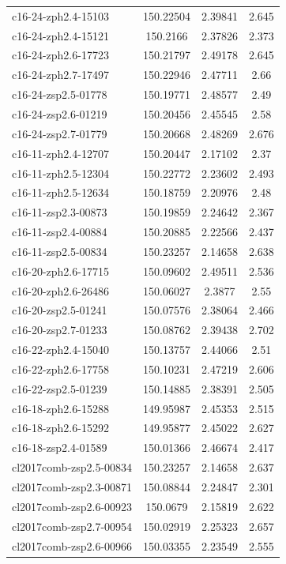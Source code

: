 \documentclass[twocolumn,tight,times]{aastex63}
\begin{document}
\begin{center}
\begin{longtable}{l|c|c|c}
c16-24-zph2.4-15103 & 150.22504 & 2.39841 & 2.645 \\
c16-24-zph2.4-15121 & 150.2166 & 2.37826 & 2.373 \\
c16-24-zph2.6-17723 & 150.21797 & 2.49178 & 2.645 \\
c16-24-zph2.7-17497 & 150.22946 & 2.47711 & 2.66 \\
c16-24-zsp2.5-01778 & 150.19771 & 2.48577 & 2.49 \\
c16-24-zsp2.6-01219 & 150.20456 & 2.45545 & 2.58 \\
c16-24-zsp2.7-01779 & 150.20668 & 2.48269 & 2.676 \\
c16-11-zph2.4-12707 & 150.20447 & 2.17102 & 2.37 \\
c16-11-zph2.5-12304 & 150.22772 & 2.23602 & 2.493 \\
c16-11-zph2.5-12634 & 150.18759 & 2.20976 & 2.48 \\
c16-11-zsp2.3-00873 & 150.19859 & 2.24642 & 2.367 \\
c16-11-zsp2.4-00884 & 150.20885 & 2.22566 & 2.437 \\
c16-11-zsp2.5-00834 & 150.23257 & 2.14658 & 2.638 \\
c16-20-zph2.6-17715 & 150.09602 & 2.49511 & 2.536 \\
c16-20-zph2.6-26486 & 150.06027 & 2.3877 & 2.55 \\
c16-20-zsp2.5-01241 & 150.07576 & 2.38064 & 2.466 \\
c16-20-zsp2.7-01233 & 150.08762 & 2.39438 & 2.702 \\
c16-22-zph2.4-15040 & 150.13757 & 2.44066 & 2.51 \\
c16-22-zph2.6-17758 & 150.10231 & 2.47219 & 2.606 \\
c16-22-zsp2.5-01239 & 150.14885 & 2.38391 & 2.505 \\
c16-18-zph2.6-15288 & 149.95987 & 2.45353 & 2.515 \\
c16-18-zph2.6-15292 & 149.95877 & 2.45022 & 2.627 \\
c16-18-zsp2.4-01589 & 150.01366 & 2.46674 & 2.417 \\
cl2017comb-zsp2.5-00834 & 150.23257 & 2.14658 & 2.637 \\
cl2017comb-zsp2.3-00871 & 150.08844 & 2.24847 & 2.301 \\
cl2017comb-zsp2.6-00923 & 150.0679 & 2.15819 & 2.622 \\
cl2017comb-zsp2.7-00954 & 150.02919 & 2.25323 & 2.657 \\
cl2017comb-zsp2.6-00966 & 150.03355 & 2.23549 & 2.555 \\

\end{longtable}
\end{center}
\end{document}
